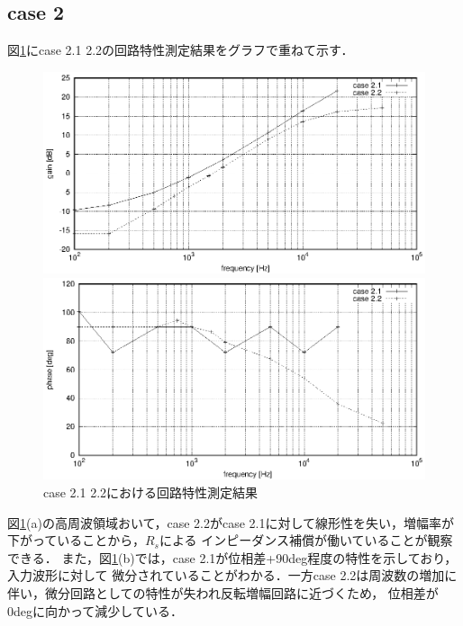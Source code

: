 \documentclass[dvipdfmx,titlepage,a4j]{jsarticle}  %
\begin{document}
\subsection{case 2}
図\ref{fig:gr:case2}にcase 2.1 2.2の回路特性測定結果をグラフで重ねて示す．
\begin{figure}[H]
  \centering
  \begin{minipage}{8cm}
    \centering
    \includegraphics[keepaspectratio, scale=0.6]{../data/case2-g.eps}
  \end{minipage}
  \begin{minipage}{8cm}
    \centering
    \includegraphics[keepaspectratio, scale=0.6]{../data/case2-f.eps}
  \end{minipage}
  \caption{case 2.1 2.2における回路特性測定結果}
  \label{fig:gr:case2}
\end{figure}

図\ref{fig:gr:case2}(a)の高周波領域おいて，case 2.2がcase 2.1に対して線形性を失い，増幅率が下がっていることから，$R_s$による
インピーダンス補償が働いていることが観察できる．
また，図\ref{fig:gr:case2}(b)では，case 2.1が位相差+90deg程度の特性を示しており，入力波形に対して
微分されていることがわかる．一方case 2.2は周波数の増加に伴い，微分回路としての特性が失われ反転増幅回路に近づくため，
位相差が0degに向かって減少している．
\end{document}
